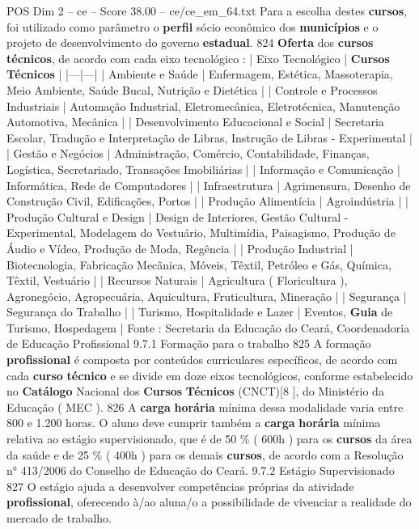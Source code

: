 \begin{textsample}{POS Dim 2 – ce – Score 38.00 – ce/ce\_em\_64.txt}
Para a escolha destes \textbf{cursos}, foi utilizado como parâmetro o \textbf{perfil} sócio econômico dos \textbf{municípios} e o projeto de desenvolvimento do governo \textbf{estadual}. 824 \textbf{Oferta} dos \textbf{cursos} \textbf{técnicos}, de acordo com cada eixo tecnológico : | Eixo Tecnológico | \textbf{Cursos} \textbf{Técnicos} | |---|---| | Ambiente e Saúde | Enfermagem, Estética, Massoterapia, Meio Ambiente, Saúde Bucal, Nutrição e Dietética | | Controle e Processos Industriais | Automação Industrial, Eletromecânica, Eletrotécnica, Manutenção Automotiva, Mecânica | | Desenvolvimento Educacional e Social | Secretaria Escolar, Tradução e Interpretação de Libras, Instrução de Libras - Experimental | | Gestão e Negócios | Administração, Comércio, Contabilidade, Finanças, Logística, Secretariado, Transações Imobiliárias | | Informação e Comunicação | Informática, Rede de Computadores | | Infraestrutura | Agrimensura, Desenho de Construção Civil, Edificações, Portos | | Produção Alimentícia | Agroindústria | | Produção Cultural e Design | Design de Interiores, Gestão Cultural - Experimental, Modelagem do Vestuário, Multimídia, Paisagismo, Produção de Áudio e Vídeo, Produção de Moda, Regência | | Produção Industrial | Biotecnologia, Fabricação Mecânica, Móveis, Têxtil, Petróleo e Gás, Química, Têxtil, Vestuário | | Recursos Naturais | Agricultura ( Floricultura ), Agronegócio, Agropecuária, Aquicultura, Fruticultura, Mineração | | Segurança | Segurança do Trabalho | | Turismo, Hospitalidade e Lazer | Eventos, \textbf{Guia} de Turismo, Hospedagem | Fonte : Secretaria da Educação do Ceará, Coordenadoria de Educação Profissional 9.7.1 Formação para o trabalho 825 A formação \textbf{profissional} é composta por conteúdos curriculares específicos, de acordo com cada \textbf{curso} \textbf{técnico} e se divide em doze eixos tecnológicos, conforme estabelecido no \textbf{Catálogo} Nacional dos \textbf{Cursos} \textbf{Técnicos} (CNCT)[8 ], do Ministério da Educação ( MEC ). 826 A \textbf{carga} \textbf{horária} mínima dessa modalidade varia entre 800 e 1.200 horas.
O aluno deve cumprir também a \textbf{carga} \textbf{horária} mínima relativa ao estágio supervisionado, que é de 50 \% ( 600h ) para os \textbf{cursos} da área da saúde e de 25 \% ( 400h ) para os demais \textbf{cursos}, de acordo com a Resolução n{\EmojiFont °} 413/2006 do Conselho de Educação do Ceará. 9.7.2 Estágio Supervisionado 827 O estágio ajuda a desenvolver competências próprias da atividade \textbf{profissional}, oferecendo à/ao aluna/o a possibilidade de vivenciar a realidade do mercado de trabalho.

\end{textsample}
